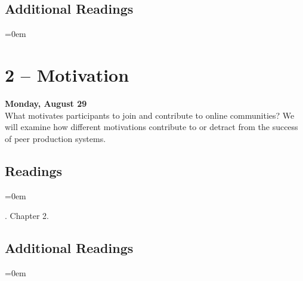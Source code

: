 \documentclass[10pt]{memoir}
\newenvironment{readinglist}{
\begin{list}{}{\leftmargin=8pt \itemindent=0em}
  \setlength{\itemsep}{8pt}
  \setlength{\parskip}{0em}
  \setlength{\parsep}{1em}
  \setlength{\parindent}{8em}}
{\end{list}}
\begin{document}
    \subsection{Additional Readings}
    \begin{readinglist}
        \item {}
        \item {}
        \item {}
        \item {}
    \end{readinglist}

\section{2 -- Motivation}
\textcolor{CUGold}{\textbf{Monday, August 29}}\\
What motivates participants to join and contribute to online communities? We will examine how different motivations contribute to or detract from the success of peer production systems. 

    \subsection{Readings}
    \begin{readinglist}
        \item {}
        \item {}. Chapter 2.
        \item {}
    \end{readinglist}
    
    \subsection{Additional Readings}
    \begin{readinglist}
        \item {}
        \item {}
        \item {}
        \item {}
        \item {}
        \item {}
    \end{readinglist}
\end{document}
